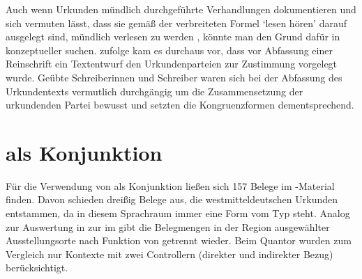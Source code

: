Auch wenn Urkunden mündlich durchgeführte Verhandlungen
dokumentieren und sich vermuten lässt, dass sie gemäß der verbreiteten Formel
 `lesen hören' darauf ausgelegt sind,
mündlich verlesen zu werden
\autocites[595]{schmidtwiegand1998b}[31]{schulze2011}, könnte man den Grund
dafür in konzeptueller  suchen.
\citet[588--589]{frenz1998b} zufolge kam es durchaus vor, dass vor Abfassung
einer Reinschrift ein Textentwurf den Urkundenparteien zur Zustimmung vorgelegt
wurde. Geübte Schreiberinnen und Schreiber waren sich bei der Abfassung des
Urkundentexts vermutlich durchgängig um die Zusammensetzung der urkundenden
Partei bewusst und setzten die Kongruenzformen dementsprechend.


\section{ als Konjunktion}
\label{sec:caokonjunktion}

Für die Verwendung von  als Konjunktion ließen sich 157 Belege im
\CAO{}-Material finden. Davon schieden dreißig Belege aus, die
westmitteldeutschen Urkunden entstammen, da in diesem
Sprachraum immer eine Form vom Typ  steht.
Analog zur Auswertung in  zur 
im \CAO{} gibt  die Belegmengen in der Region
ausgewählter Ausstellungs\-orte nach Funktion von  getrennt wieder.
Beim Quantor wurden zum Vergleich nur Kontexte mit zwei
Controllern (direkter und indirekter Bezug) berücksichtigt.

